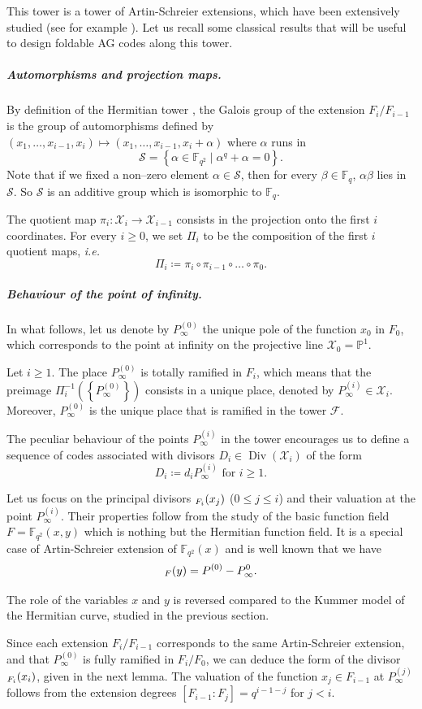 \documentclass[a4paper,USenglish,autoref]{lipics-v2021}
\newcommand\F{\mathbb{F}}
\newcommand\Fq{\mathbb{F}_q}
\newcommand\PP{\mathbb{P}}
\DeclareMathOperator{\Div}{Div}
\let\div\relax\DeclareMathOperator{\div}{div}
\newcommand{\set}[1]{\left\{#1\right\}}
\newcommand\calX{\mathcal{X}}
\newcommand\calF{\mathcal{F}}
\newcommand\mydef{\coloneqq}
\begin{document}
This tower is a tower of Artin-Schreier extensions, which have been extensively studied (see for example \cite{S08}).  Let us recall some classical results that will be useful to design foldable AG codes along this tower.

\subparagraph*{Automorphisms and projection maps.}
By definition of the Hermitian tower \cite[Proposition 3.7.10]{S08}, the Galois group of the extension $F_i/F_{i-1}$ is the group of automorphisms defined by $(x_1, \dots, x_{i-1}, x_i) \mapsto (x_1, \dots, x_{i-1}, x_i + \alpha)$ where $\alpha$ runs in 
\[\mathcal{S}  = \set{\alpha \in \F_{q^2} \mid \alpha^q + \alpha = 0}.\]
Note that if we fixed a non--zero element $\alpha \in \mathcal{S}$, then for every $\beta \in \Fq$, $\alpha \beta$ lies in $\mathcal{S}$. So $\mathcal{S}$ is an additive group which is isomorphic to $\Fq$.

The quotient map $\pi_i : \calX_i \rightarrow \calX_{i-1}$ consists in the projection onto the first $i$ coordinates. For every $i\geq 0$, we set $\Pi_i$ to be the composition of the first $i$ quotient maps, \textit{i.e.}
\[ \Pi_i \mydef \pi_i \circ \pi_{i-1}\circ \dots \circ \pi_0.\]

\subparagraph*{Behaviour of the point of infinity.}

In what follows, let us denote by $P_{\infty}^{(0)}$ the unique pole of the function $x_0$ in $F_0$, which corresponds to the point at infinity on the projective line $\calX_0=\PP^1$.

\begin{lemma}[{\cite[Proposition 3.7.8]{S08}}]
	Let $i \geq 1$. The place $P_{\infty}^{(0)}$ is totally ramified in $F_i$, which means that the preimage $\Pi_i^{-1}\left(\left\{P_{\infty}^{(0)}\right\}\right)$ consists in a unique place, denoted by $P_{\infty}^{(i)} \in \calX_i$.
	Moreover,  $P_{\infty}^{(0)}$ is the unique place that is ramified in the tower $\calF$.
\end{lemma}


The peculiar behaviour of the points $P_\infty^{(i)}$ in the tower encourages us to define a sequence of codes associated with divisors $D_i \in \Div(\calX_i)$ of the form 
\[D_i\mydef d_i P_\infty^{(i)} \text{ for }i \geq 1.\]

Let us focus on the principal divisors $\div_{F_i}(x_j)$ ($0\leq j \leq i$) and their valuation at the point $P_\infty^{(i)}$. 
Their properties follow from the study of the basic function field $F=\mathbb{F}_{q^2}(x,y)$ which is nothing but the Hermitian function field. It is a special case of Artin-Schreier extension of $\mathbb{F}_{q^2}(x)$ and is well known that we have 
\[\div_{F}(y) = P^{(0)}-P_{\infty}^0.\]
\begin{remark}
	The role of the variables $x$ and $y$ is reversed compared to the Kummer model of the Hermitian curve, studied in the previous section. 
\end{remark}
Since each extension $F_i/F_{i-1}$ corresponds to the same Artin-Schreier extension, and that $P_{\infty}^{(0)}$ is fully ramified in $F_i/F_0$, we can deduce the form of the divisor $\div_{F_i}(x_i)$, given in the next lemma. The valuation of the function $x_j \in F_{i-1}$ at $P_{\infty}^{(j)}$ follows from the extension degrees $[F_{i-1}:F_j]=q^{i-1-j}$ for $j<i$.
\end{document}
